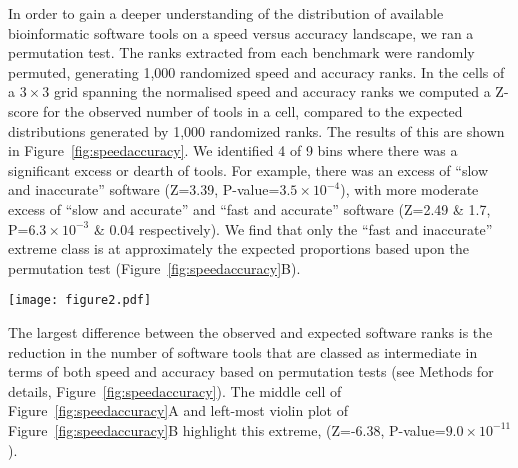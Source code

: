 \documentclass{bmcart}
\begin{document}
In order to gain a deeper understanding of the distribution of
available bioinformatic software tools on a speed versus accuracy
landscape, we ran a permutation test. The ranks extracted
from each benchmark were randomly permuted, generating 1,000
randomized speed and accuracy ranks. In the cells of a $3\times3$
grid spanning the normalised speed and accuracy ranks we computed a
Z-score for the observed number of tools in a cell, compared to the
expected distributions generated by 1,000 randomized ranks. The results
of this are shown in Figure~\ref{fig:speedaccuracy}. We identified 4
of 9 bins where there was a significant excess or dearth of tools. For
example, there was an excess of ``slow and inaccurate'' software (Z=3.39,
P-value=$3.5\times 10^{-4}$), with more moderate excess of ``slow and accurate'' and ``fast and accurate'' software (Z=2.49 \& 1.7, P=$6.3\times 10^{-3}$ \& 0.04 respectively). We find that only the ``fast and inaccurate'' extreme class is at approximately the
expected proportions based upon the permutation test (Figure~\ref{fig:speedaccuracy}B).


\begin{figure*}[htb!]
\centering
\texttt{[image: figure2.pdf]}
\caption{\textbf{A.} A heatmap indicating the relative paucity or abundance of
  software in the range of possible accuracy and speed rankings. Redder
  colours indicate an abundance of software tools in an accuracy and
  speed category, while bluer colours indicate scarcity of software in
  an accuracy and speed category. The abundance is quantified using a
  Z-score computation for each bin, this is derived from 1,000 random
  permutations of speed and accuracy ranks from each
  benchmark. Mean normalised ranks of accuracy and speed have been
  binned into 9 classes (a $3\times 3$ grid) that range from
  comparatively slow and inaccurate to comparatively
  fast and accurate. Z-scores with a P-value less than 0.05 are indicated
  with a ‘$\vartimes$’. \textbf{B.} The z-score distributions from the permutation tests (indicated with the wheat coloured violin plots) compared to 
  the z-score for the observed values for each of the corner and middle square of the heatmap.}
\label{fig:speedaccuracy}
\end{figure*}

The largest difference between the observed and expected software ranks is the reduction in the number of software tools that are
classed as intermediate in terms of both speed and accuracy based on
permutation tests (see Methods for details, Figure~\ref{fig:speedaccuracy}). The middle cell
of Figure~\ref{fig:speedaccuracy}A and left-most violin plot of Figure~\ref{fig:speedaccuracy}B highlight this extreme, (Z=-6.38,
P-value=$9.0\times 10^{-11}$). 
\end{document}
